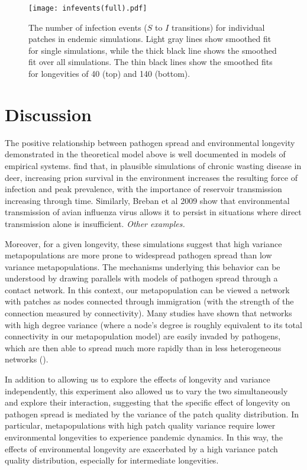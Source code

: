 \documentclass{svjour3}
\begin{document}
\begin{figure}
\centering
\texttt{[image: infevents(full).pdf]}
\caption{The number of infection events ($S$ to $I$ transitions) for individual patches in endemic simulations.  Light gray lines show smoothed fit for single simulations, while the thick black line shows the smoothed fit over all simulations.  The thin black lines show the smoothed fits for longevities of 40 (top) and 140 (bottom).}
\label{infections}
\end{figure}

\section{Discussion}
\label{discussion} 

The positive relationship between pathogen spread and environmental longevity demonstrated in the theoretical model above is well documented in models of empirical systems.  \cite{Almberg2011} find that, in plausible simulations of chronic wasting disease in deer, increasing prion survival in the environment increases the resulting force of infection and peak prevalence, with the  importance of reservoir transmission increasing through time.  Similarly, Breban et al 2009 show that environmental transmission of avian influenza virus allows it to persist in situations where direct transmission alone is insufficient.  \emph{Other examples.}

Moreover, for a given longevity, these simulations suggest that high variance metapopulations are more prone to widespread pathogen spread than low variance metapopulations.  The mechanisms underlying this behavior can be understood by drawing parallels with models of pathogen spread through a contact network.  In this context, our metapopulation can be viewed a network with patches as nodes connected through immigration (with the strength of the connection measured by connectivity).  Many studies have shown that networks with high degree variance (where a node's degree is roughly equivalent to its total connectivity in our metapopulation model) are easily invaded by pathogens, which are then able to spread much more rapidly than in less heterogeneous networks (\cite{Pastor-Satorras2001}).

In addition to allowing us to explore the effects of longevity and variance independently, this experiment also allowed us to vary the two simultaneously and explore their interaction, suggesting that the specific effect of longevity on pathogen spread is mediated by the variance of the patch quality distribution.  In particular, metapopulations with high patch quality variance require lower environmental longevities to experience pandemic dynamics.  In this way, the effects of environmental longevity are exacerbated by a high variance patch quality distribution, especially for intermediate longevities.  
\end{document}
